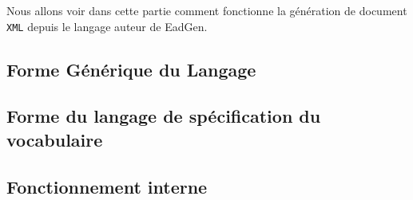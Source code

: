 Nous allons voir dans cette partie comment fonctionne la génération de document \texttt{XML} depuis le langage auteur de EadGen. 

\subsection{Forme Générique du Langage}


\subsection{Forme du langage de spécification du vocabulaire}


\subsection{Fonctionnement interne}

